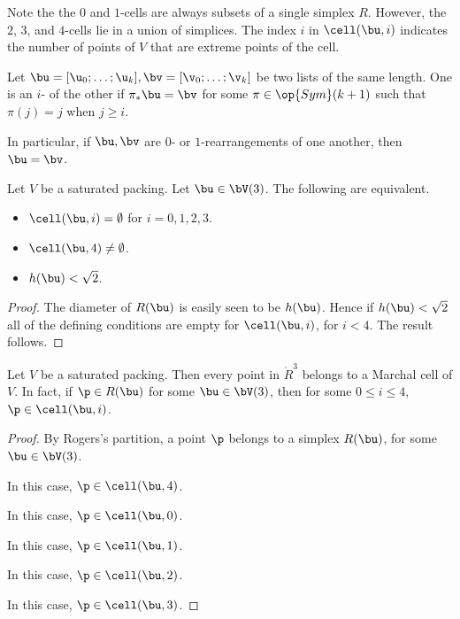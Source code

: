 Note the the $0$ and $1$-cells are always subsets of a single simplex
$R$.  However, the $2$, $3$, and $4$-cells lie in a union of
simplices.  The index $i$ in  $\cell(\bu,i)$ indicates the number
of points of $V$ that are extreme points of the cell. 

\begin{definition}[$i$-rearrangement] 
Let $\bu=[\u_0;\ldots;\u_k],\bv=[\v_0;\ldots;\v_k]$ be two lists of the same length.  
One is an
 $i$- of the other if
$\pi_*\bu = \bv$ for some $\pi\in\op{Sym}(k+1)$ such
that 
$\pi(j) = j$  when $j \ge i$.
\end{definition}

In particular, if $\bu,\bv$ are $0$- or $1$-rearrangements of one another,
then $\bu = \bv$.


\begin{lemma}[]\label{lemma:M-complement4} 
Let $V$ be a saturated packing.  Let $\bu\in \bV(3)$.
The following are equivalent.
\begin{itemize} 
\item  $\cell(\bu,i)=\emptyset$ for $i=0,1,2,3$.
\item  $\cell(\bu,4)\ne\emptyset$.
\item  $h(\bu)<\sqrt2$.
\end{itemize}
\end{lemma}

\begin{proof} 
The diameter of $R(\bu)$ is easily seen to be $h(\bu)$.  Hence if $h(\bu)<\sqrt2$
all of the defining conditions are empty for $\cell(\bu,i)$, for $i<4$.  The result follows.
\end{proof}

\begin{lemma}[]\label{lemma:M-exhaust} 
Let $V$ be a saturated packing.  Then every point in $\ring{R}^3$ belongs to
a Marchal cell of $V$.  In fact, if $\p\in R(\bu)$ for some $\bu\in \bV(3)$, 
then for some $0\le i\le 4$, $\p\in \cell(\bu,i)$.
\end{lemma}

\begin{proof} 
By Rogers's partition, a point $\p$ belongs to a simplex
$R(\bu)$, for some $\bu\in\bV(3)$.  

\noindent
{} In this case,  $\p\in\cell(\bu,4)$.

\noindent
{} In this case, $\p\in\cell(\bu,0)$.

\noindent
{} 
In this case, $\p\in \cell(\bu,1)$.

\noindent
{} In this
case, $\p\in \cell(\bu,2)$.

\noindent
{} In this
case, $\p\in \cell(\bu,3)$.
\end{proof}




